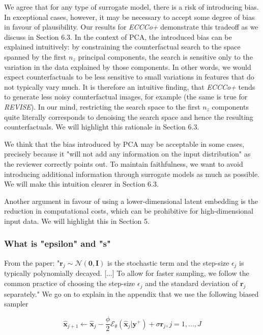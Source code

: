 \documentclass[letterpaper]{article} %
\begin{document}
We agree that for any type of surrogate model, there is a risk of introducing bias. In exceptional cases, however, it may be necessary to accept some degree of bias in favour of plausibility. Our results for \textit{ECCCo+} demonstrate this tradeoff as we discuss in Section 6.3. In the context of PCA, the introduced bias can be explained intuitively: by constraining the counterfactual search to the space spanned by the first $n_z$ principal components, the search is sensitive only to the variation in the data explained by those components. In other words, we would expect counterfactuals to be less sensitive to small variations in features that do not typically vary much. It is therefore an intuitive finding, that \textit{ECCCo+} tends to generate less noisy counterfactual images, for example (the same is true for \textit{REVISE}). In our mind, restricting the search space to the first $n_z$ components quite literally corresponds to denoising the search space and hence the resulting counterfactuals. We will highlight this rationale in Section 6.3.

We think that the bias introduced by PCA may be acceptable in some cases, precisely because it "will not add any information on the input distribution" as the reviewer correctly points out. To maintain faithfulness, we want to avoid introducing additional information through surrogate models as much as possible. We will make this intuition clearer in Section 6.3.

Another argument in favour of using a lower-dimensional latent embedding is the reduction in computational costs, which can be prohibitive for high-dimensional input data. We will highlight this in Section 5. 

\subsubsection{What is "epsilon" and "s"}

From the paper: "$\mathbf{r}_j \sim \mathcal{N}(\mathbf{0},\mathbf{I})$ is the stochastic term and the step-size $\epsilon_j$ is typically polynomially decayed. [...] To allow for faster sampling, we follow the common practice of choosing the step-size $\epsilon_j$ and the standard deviation of $\mathbf{r}_j$ separately." We go on to explain in the appendix that we use the following biased sampler 

$$
\hat{\mathbf{x}}_{j+1} \leftarrow \hat{\mathbf{x}}_j - \frac{\phi}{2} \mathcal{E}_{\theta}(\hat{\mathbf{x}}_j|\mathbf{y}^+) + \sigma \mathbf{r}_j, j=1,...,J
$$
\end{document}
